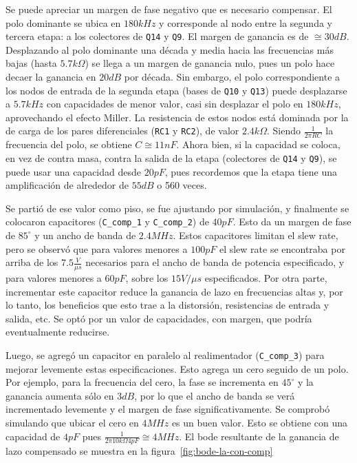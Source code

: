 \documentclass[a4paper,12pt,twoside]{article}
\begin{document}
Se puede apreciar un margen de fase negativo que es necesario compensar. El polo dominante se ubica en $180kHz$ y corresponde al nodo entre la segunda y tercera etapa: a los colectores de \texttt{Q14} y \texttt{Q9}. El margen de ganancia es de $\cong 30dB$. Desplazando al polo dominante una década y media hacia las frecuencias más bajas (hasta $5.7k\Omega$) se llega a un margen de ganancia nulo, pues un polo hace decaer la ganancia en $20dB$ por década. Sin embargo, el polo correspondiente a los nodos de entrada de la segunda etapa (bases de \texttt{Q10} y \texttt{Q13}) puede desplazarse a $5.7kHz$ con capacidades de menor valor, casi sin desplazar el polo en $180kHz$, aprovechando el efecto Miller. 
La resistencia de estos nodos está dominada por la de carga de los pares diferenciales (\texttt{RC1} y \texttt{RC2}), de valor $2.4k\Omega$. Siendo $\frac{1}{2 \pi RC}$ la frecuencia del polo, se obtiene $C\cong 11nF$. Ahora bien, si la capacidad se coloca, en vez de contra masa, contra la salida de la etapa (colectores de \texttt{Q14} y \texttt{Q9}), se puede usar una capacidad desde $20pF$, pues recordemos que la etapa tiene una amplificación de alrededor de $55dB$ o 560 veces. 

Se partió de ese valor como piso, se fue ajustando por simulación, y finalmente se colocaron capacitores (\texttt{C\_comp\_1} y \texttt{C\_comp\_2}) de $40pF$. Esto da un margen de fase de $85^{\circ}$ y un ancho de banda de $2.4MHz$. Estos capacitores limitan el slew rate, pero se observó que para valores menores a $100pF$ el slew rate se encontraba por arriba de los $7.5\frac{V}{\mu s}$ necesarios para el ancho de banda de potencia especificado, y para valores menores a $60pF$, sobre los $15V/\mu s$ especificados. Por otra parte, incrementar este capacitor reduce la ganancia de lazo en frecuencias altas y, por lo tanto, los beneficios que esto trae a la distorsión, resistencias de entrada y salida, etc. Se optó por un valor de capacidades, con margen, que podría eventualmente reducirse.

Luego, se agregó un capacitor en paralelo al realimentador (\texttt{C\_comp\_3}) para mejorar levemente estas especificaciones. Esto agrega un cero seguido de un polo. Por ejemplo, para la frecuencia del cero, la fase se incrementa en $45^{\circ}$ y la ganancia aumenta sólo en $3dB$, por lo que el ancho de banda se verá incrementado levemente y el margen de fase significativamente. Se comprobó simulando que ubicar el cero en $4MHz$ es un buen valor. Esto se obtiene con una capacidad de $4pF$ pues $\frac{1}{2 \pi 10k\Omega 4pF}\cong 4MHz$. El bode resultante de la ganancia de lazo compensado se muestra en la figura~\ref{fig:bode-la-con-comp}
\end{document}
